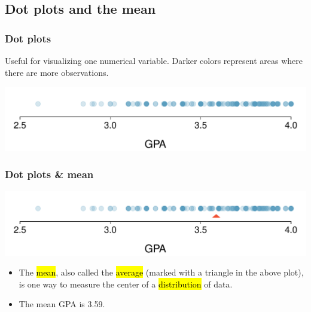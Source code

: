 
\subsection{Dot plots and the mean}


\begin{frame}
\frametitle{Dot plots}

Useful for visualizing one numerical variable. Darker colors represent areas where there are more observations.

\begin{center}
\includegraphics[width=\textwidth]{1-6_numerical_data/figures/gpa_dot_plot/gpa_dot_plot}
\end{center}


\end{frame}



\begin{frame}
\frametitle{Dot plots \& mean}

\begin{center}
\includegraphics[width=\textwidth]{1-6_numerical_data/figures/gpa_dot_plot/gpa_dot_plot_mean}
\end{center}

\begin{itemize}

\item The \hl{mean}, also called the \hl{average} (marked with a triangle in the above plot), is one way to measure the center of a \hl{distribution} of data.

\item The mean GPA is 3.59.

\end{itemize} 

\end{frame}

